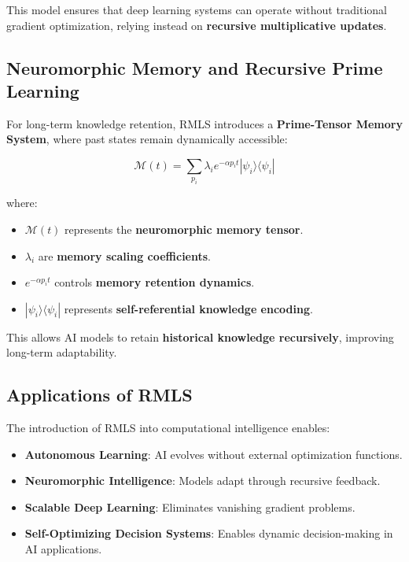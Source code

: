\documentclass{article}
\theoremstyle{plain}
\theoremstyle{plain}
\theoremstyle{definition}
\theoremstyle{remark}
\begin{document}
This model ensures that deep learning systems can operate without traditional gradient optimization, relying instead on \textbf{recursive multiplicative updates}.

\subsection{Neuromorphic Memory and Recursive Prime Learning}

For long-term knowledge retention, RMLS introduces a \textbf{Prime-Tensor Memory System}, where past states remain dynamically accessible:

\begin{equation}
\mathcal{M}(t) = \sum_{p_i} \lambda_i e^{- \alpha p_i t} |\psi_i\rangle \langle \psi_i |
\end{equation}

where:
\begin{itemize}
    \item $\mathcal{M}(t)$ represents the \textbf{neuromorphic memory tensor}.
    \item $\lambda_i$ are \textbf{memory scaling coefficients}.
    \item $e^{- \alpha p_i t}$ controls \textbf{memory retention dynamics}.
    \item $|\psi_i\rangle \langle \psi_i |$ represents \textbf{self-referential knowledge encoding}.
\end{itemize}

This allows AI models to retain \textbf{historical knowledge recursively}, improving long-term adaptability.

\subsection{Applications of RMLS}

The introduction of RMLS into computational intelligence enables:
\begin{itemize}
    \item \textbf{Autonomous Learning}: AI evolves without external optimization functions.
    \item \textbf{Neuromorphic Intelligence}: Models adapt through recursive feedback.
    \item \textbf{Scalable Deep Learning}: Eliminates vanishing gradient problems.
    \item \textbf{Self-Optimizing Decision Systems}: Enables dynamic decision-making in AI applications.
\end{itemize}
\end{document}
